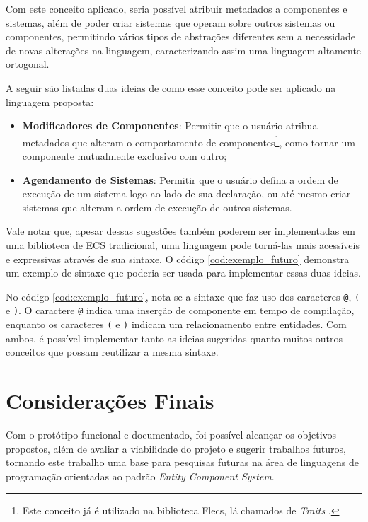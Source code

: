 Com este conceito aplicado, seria possível atribuir metadados a componentes e sistemas, além de poder criar sistemas que operam sobre outros sistemas ou componentes, permitindo vários tipos de abstrações diferentes sem a necessidade de novas alterações na linguagem, caracterizando assim uma linguagem altamente ortogonal.

A seguir são listadas duas ideias de como esse conceito pode ser aplicado na linguagem proposta:

\begin{itemize}
    \item \textbf{Modificadores de Componentes}: Permitir que o usuário atribua metadados que alteram o comportamento de componentes\footnote{Este conceito já é utilizado na biblioteca Flecs, lá chamados de \textit{Traits} \cite{flecs}.}, como tornar um componente mutualmente exclusivo com outro;
    \item \textbf{Agendamento de Sistemas}: Permitir que o usuário defina a ordem de execução de um sistema logo ao lado de sua declaração, ou até mesmo criar sistemas que alteram a ordem de execução de outros sistemas.
\end{itemize}

Vale notar que, apesar dessas sugestões também poderem ser implementadas em uma biblioteca de ECS tradicional, uma linguagem pode torná-las mais acessíveis e expressivas através de sua sintaxe. O código \autoref{cod:exemplo_futuro} demonstra um exemplo de sintaxe que poderia ser usada para implementar essas duas ideias.

\codigoRust

\vspace{-1em}

No código \autoref{cod:exemplo_futuro}, nota-se a sintaxe que faz uso dos caracteres \texttt{@}, \texttt{(} e \texttt{)}. O caractere \texttt{@} indica uma inserção de componente em tempo de compilação, enquanto os caracteres \texttt{(} e \texttt{)} indicam um relacionamento entre entidades. Com ambos, é possível implementar tanto as ideias sugeridas quanto muitos outros conceitos que possam reutilizar a mesma sintaxe.

\section{Considerações Finais}

Com o protótipo funcional e documentado, foi possível alcançar os objetivos propostos, além de avaliar a viabilidade do projeto e sugerir trabalhos futuros, tornando este trabalho uma base para pesquisas futuras na área de linguagens de programação orientadas ao padrão \textit{Entity Component System}.
